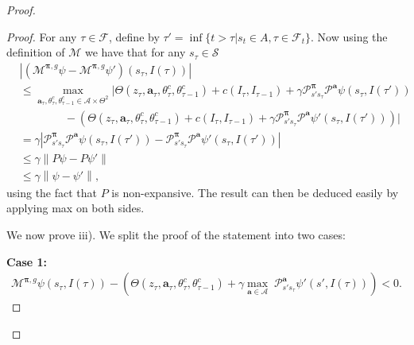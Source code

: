 \documentclass{article}
\begin{document}
\begin{proof}
\begin{proof}
For any $\tau\in\mathcal{F}$, define by $\tau'=\inf\{t>\tau|s_t\in A,\tau\in\mathcal{F}_t\}$. Now using the definition of $\mathcal{M}$ we have that for any $s_\tau\in\mathcal{S}$
\begin{align*}
&\left|(\mathcal{M}^{\boldsymbol{\pi},g}\psi-\mathcal{M}^{\boldsymbol{\pi},g}\psi')(s_{\tau},I(\tau))\right|
\\&\leq \underset{\boldsymbol{a}_\tau,\theta^c_\tau,\theta^c_{\tau-1}\in \boldsymbol{\mathcal{A}}\times \Theta^2}{\max}    \Bigg|\Theta(z_\tau,\boldsymbol{a}_\tau,\theta^c_\tau,\theta^c_{\tau-1})+c(I_\tau,I_{\tau-1})+\gamma\mathcal{P}^{\boldsymbol{\pi}}_{s's_\tau}\mathcal{P}^{\boldsymbol{a}}\psi(s_{\tau},I(\tau'))
\\&\qquad\qquad-\left(\Theta(z_\tau,\boldsymbol{a}_\tau,\theta^c_\tau,\theta^c_{\tau-1})+c(I_\tau,I_{\tau-1})+\gamma\mathcal{P}^{\boldsymbol{\pi}}_{s's_\tau}\mathcal{P}^{\boldsymbol{a}}\psi'(s_{\tau},I(\tau'))\right)\Bigg| 
\\&= \gamma\left|\mathcal{P}^{\boldsymbol{\pi}}_{s's_\tau}\mathcal{P}^{\boldsymbol{a}}\psi(s_{\tau},I(\tau'))-\mathcal{P}^{\boldsymbol{\pi}}_{s's_\tau}\mathcal{P}^{\boldsymbol{a}}\psi'(s_{\tau},I(\tau'))\right| 
\\&\leq \gamma\left\|P\psi-P\psi'\right\|
\\&\leq \gamma\left\|\psi-\psi'\right\|,
\end{align*}
using the fact that $P$ is non-expansive. The result can then be deduced easily by applying max on both sides.

We now prove iii). We split the proof of the statement into two cases:

\textbf{Case 1:} 
\begin{align}\mathcal{M}^{\boldsymbol{\pi},g}\psi(s_{\tau},I(\tau))-\left(\Theta(z_\tau,\boldsymbol{a}_\tau,\theta^c_{\tau},\theta^c_{\tau-1})+\gamma\underset{\boldsymbol{a}\in\boldsymbol{\mathcal{A}}}{\max}\;\mathcal{P}^{\boldsymbol{a}}_{s's_\tau}\psi'(s',I(\tau))\right)<0.
\end{align}


\end{proof}
\end{proof}
\end{document}
